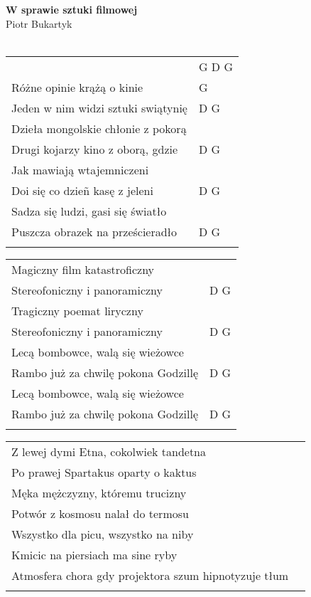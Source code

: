 \documentclass[a5paper]{article}
\begin{document}


\noindent
\fontsize{12pt}{15pt}\selectfont
\textbf{W sprawie sztuki filmowej} \\
\fontsize{8pt}{10pt}\selectfont
Piotr Bukartyk \\ \\
\fontsize{10pt}{12pt}\selectfont
{}
\begin{tabular}{@{}p{7.50cm}p{3cm}@{}}
\noindent
	& G D G \\
Różne opinie krążą o kinie & G \\
Jeden w nim widzi sztuki swiątynię & D G \\
Dzieła mongolskie chłonie z pokorą \\
Drugi kojarzy kino z oborą, gdzie & D G \\
Jak mawiają wtajemniczeni \\
Doi się co dzieñ kasę z jeleni & D G \\
Sadza się ludzi, gasi się światło \\
Puszcza obrazek na prześcieradło & D G \\ \\
\end{tabular}

\noindent
\begin{tabular}{@{}p{6.50cm}p{3cm}@{}}
Magiczny film katastroficzny \\
Stereofoniczny i panoramiczny & D G \\
Tragiczny poemat liryczny \\
Stereofoniczny i panoramiczny & D G \\
Lecą bombowce, walą się wieżowce \\
Rambo już za chwilę pokona Godzillę & D G \\
Lecą bombowce, walą się wieżowce \\
Rambo już za chwilę pokona Godzillę & D G \\ \\
\end{tabular}

\noindent
\begin{tabular}{@{}p{6.50cm}p{3cm}@{}}
Z lewej dymi Etna, cokolwiek tandetna \\
Po prawej Spartakus oparty o kaktus \\
Męka mężczyzny, któremu trucizny \\
Potwór z kosmosu nalał do termosu \\
Wszystko dla picu, wszystko na niby \\
Kmicic na piersiach ma sine ryby \\
Atmosfera chora gdy projektora szum hipnotyzuje tłum \\ \\
\end{tabular}
\end{document}

